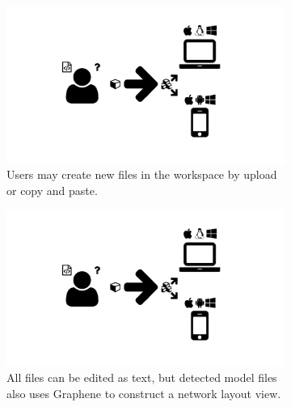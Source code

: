 \begin{figure}
  \centering
  \begin{subfigure}[b]{\textwidth}
    \includegraphics[width=\textwidth,page=11,trim=0.37cm 3.65cm 13.1cm 3.3cm, clip=true]{images/Figures.pdf}
    \caption{Users may create new files in the workspace by upload or copy and paste.}
    \label{Figure:carbon-workspaces-file-upload}
  \end{subfigure}
  \begin{subfigure}[b]{\textwidth}
    \includegraphics[width=\textwidth,page=11,trim=13.1cm 3.65cm 0.37cm 3.3cm, clip=true]{images/Figures.pdf}
    \caption{All files can be edited as text, but detected model files also uses Graphene to construct a network layout view.}
    \label{Figure:carbon-workspaces-model-view}
  \end{subfigure}
  \caption{}
  \label{Figure:carbon-workspaces-files}
\end{figure}

